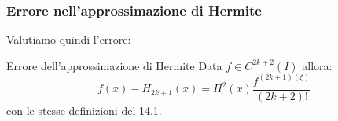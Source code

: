 \documentclass[a4paper,11pt]{article}
\begin{document}
\newpage

\subsubsection{Errore nell'approssimazione di Hermite}
Valutiamo quindi l'errore:
\begin{theorem}{Errore dell'approssimazione di Hermite}
	Data $f \in C^{2k + 2}(I)$ allora:
$$
f(x) - H_{2k + 1}(x) = \Pi^2 (x) \frac{f^{(2k + 1)(\xi)}}{(2k + 2)!}
$$
con le stesse definizioni del 14.1.
\end{theorem}
\end{document}
